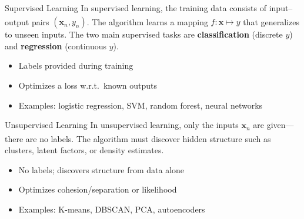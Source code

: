 \begin{v3topic}{Supervised Learning}
    In supervised learning, the training data consists of input--output pairs $(\mathbf{x}_n, y_n)$\textsuperscript{\cite[][pp.~8--12]{iiiCourseMachineLearning}}.
    The algorithm learns a mapping $f: \mathbf{x} \mapsto y$ that generalizes to unseen inputs.
    The two main supervised tasks are \textbf{classification} (discrete $y$) and \textbf{regression} (continuous $y$).
\visualseparator
    \begin{itemize}
        \item Labels provided during training
        \item Optimizes a loss w.r.t.\ known outputs
        \item Examples: logistic regression, SVM, random forest, neural networks
    \end{itemize}

\end{v3topic}
\begin{v3topic}{Unsupervised Learning}
    In unsupervised learning, only the inputs $\mathbf{x}_n$ are given---there are no labels\textsuperscript{\cite[][p.~166]{iiiCourseMachineLearning}}.
    The algorithm must discover hidden structure such as clusters, latent factors, or density estimates.
\visualseparator
    \begin{itemize}
        \item No labels; discovers structure from data alone
        \item Optimizes cohesion/separation or likelihood
        \item Examples: K-means, DBSCAN, PCA, autoencoders
    \end{itemize}

\end{v3topic}
